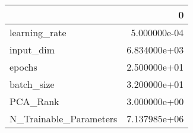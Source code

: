 \begin{tabular}{lr}
\toprule
{} &             0 \\
\midrule
learning\_rate          &  5.000000e-04 \\
input\_dim              &  6.834000e+03 \\
epochs                 &  2.500000e+01 \\
batch\_size             &  3.200000e+01 \\
PCA\_Rank               &  3.000000e+00 \\
N\_Trainable\_Parameters &  7.137985e+06 \\
\bottomrule
\end{tabular}
